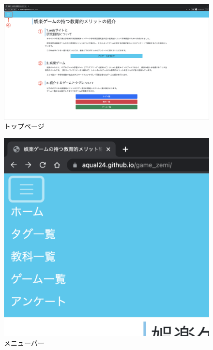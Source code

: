 \begin{figure}[H]
\begin{center}
 \includegraphics[keepaspectratio, scale=0.15]{PDF/toppage.pdf}
\end{center}
 \caption{トップページ}
 \label{fig:トップページ}
\end{figure}

\begin{figure}[H]
\begin{center}
 \includegraphics[keepaspectratio, scale=0.3]{PDF/menubar.pdf}
\end{center}
 \caption{メニューバー}
 \label{fig:メニューバー}
\end{figure}

